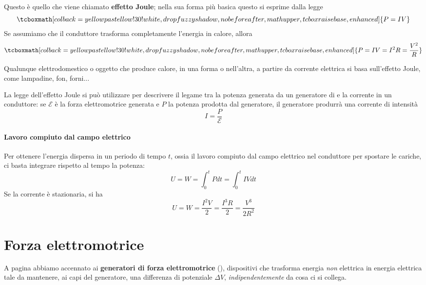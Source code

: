 Questo è quello che viene chiamato \textbf{effetto Joule}; nella sua forma più basica questo si esprime dalla legge
\begin{equation}
	\tcboxmath[colback=yellowpastellow!30!white,drop fuzzy shadow, nobeforeafter, math upper, tcbox raise base, enhanced]{P=IV}
\end{equation}
Se assumiamo che il conduttore trasforma completamente l'energia in calore, allora
\begin{equation}
	\tcboxmath[colback=yellowpastellow!30!white,drop fuzzy shadow, nobeforeafter, math upper, tcbox raise base, enhanced]{P=IV=I^2R=\frac{V^2}{R}}
\end{equation}
\begin{example}
	Qualunque elettrodomestico o oggetto che produce calore, in una forma o nell'altra, a partire da corrente elettrica si basa sull'effetto Joule, come lampadine, fon, forni...
\end{example}
\begin{observe}
	La legge dell'effetto Joule si può utilizzare per descrivere il legame tra la potenza generata da un generatore di \fem e la corrente in un conduttore: se $\mathcal{E}$ è la forza elettromotrice generata e $P$ la potenza prodotta dal generatore, il generatore produrrà una corrente di intensità
	\begin{equation}
		I=\frac{P}{\mathcal{E}}
	\end{equation}
\end{observe}
\paragraph{Lavoro compiuto dal campo elettrico}
Per ottenere l'energia dispersa in un periodo di tempo $t$, ossia il lavoro compiuto dal campo elettrico nel conduttore per spostare le cariche, ci basta integrare rispetto al tempo la potenza:
\begin{equation}
	U=W=\int_{0}^{t}Pdt=\int_{0}^t IVdt
\end{equation}
Se la corrente è stazionaria, si ha
\begin{equation}
	U=W=\frac{I^2V}{2}=\frac{I^3R}{2}=\frac{V^3}{2R^2}
\end{equation}
\section{Forza elettromotrice}\label{femxesteso}
A pagina \pageref{fem} abbiamo accennato ai \textbf{generatori di forza elettromotrice} (\fem), dispositivi che trasforma energia \textit{non} elettrica in energia elettrica tale da mantenere, ai capi del generatore, una differenza di potenziale $\Delta V$, \textit{indipendentemente} da cosa ci si collega.

